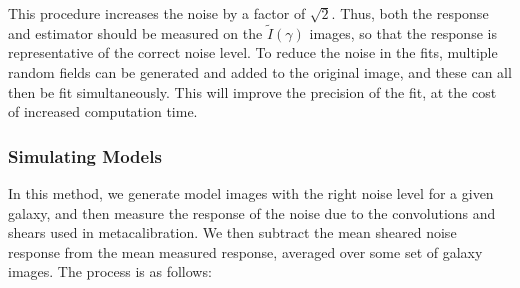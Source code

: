 \documentclass[usegraphicx,usenatbib]{mn2e}
\newcommand{\mcal}{metacalibration}
\begin{document}
This procedure increases the noise by a factor of $\sqrt 2$.  Thus, both the
response and estimator should be measured on the $\tilde{I}(\gamma)$ images, so
that the response is representative of the correct noise level.  To reduce the
noise in the fits, multiple random fields can be generated and added to the
original image, and these can all then be fit simultaneously.  This will
improve the precision of the fit, at the cost of increased computation time.


\subsubsection{Simulating Models}

In this method, we generate model images with the right noise level for a
given galaxy, and then measure the response of the noise due to the
convolutions and shears used in \mcal.  We then subtract the mean sheared noise
response from the mean measured response, averaged over some set of galaxy
images. The process is as follows:
\end{document}
